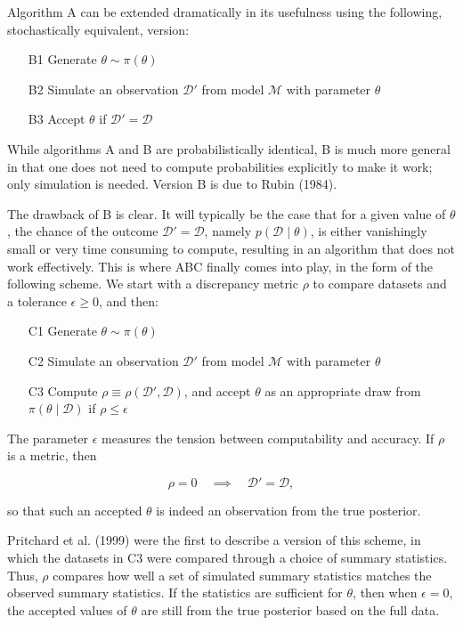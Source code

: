 Algorithm A can be extended dramatically in its usefulness using the following, stochastically equivalent, version:

\begin{itemize}
    \item[B1] Generate $\theta \sim \pi(\theta)$
    \item[B2] Simulate an observation $\mathcal{D}'$ from model $\mathcal{M}$ with parameter $\theta$
    \item[B3] Accept $\theta$ if $\mathcal{D}' = \mathcal{D}$
\end{itemize}
    

While algorithms A and B are probabilistically identical, B is much more general in that one does not need to compute probabilities explicitly to make it work; only simulation is needed. Version B is due to Rubin (1984). 

The drawback of B is clear. It will typically be the case that for a given value of $\theta$, the chance of the outcome $\mathcal{D}'=\mathcal{D}$, namely $p(\mathcal{D} \mid \theta)$, is either vanishingly small or very time consuming to compute, resulting in an algorithm that does not work effectively. This is where ABC finally comes into play, in the form of the following scheme. We start with a discrepancy metric $\rho$ to compare datasets and a tolerance $\epsilon \geq 0$, and then: 

\begin{itemize}
    \item[C1] Generate $\theta \sim \pi(\theta)$
    \item[C2] Simulate an observation $\mathcal{D}'$ from model $\mathcal{M}$ with parameter $\theta$
    \item[C3] Compute $\rho \equiv \rho (\mathcal{D}', \mathcal{D})$, and accept $\theta$ as an appropriate draw from $\pi (\theta \mid \mathcal{D})$ if $\rho \leq \epsilon$
\end{itemize}
    
The parameter $\epsilon$ measures the tension between computability and accuracy. If $\rho$ is a metric, then 

\begin{equation*}
    \rho = 0 \quad \implies \quad \mathcal{D}'=\mathcal{D},
\end{equation*}

so that such an accepted $\theta$ is indeed an observation from the true posterior. 

Pritchard et al. (1999) were the first to describe a version of this scheme, in which the datasets in C3 were compared through a choice of summary statistics. Thus, $\rho$ compares how well a set of simulated summary statistics matches the observed summary statistics. If the statistics are sufficient for $\theta$, then when $\epsilon=0$, the accepted values of $\theta$ are still from the true posterior based on the full data. 

